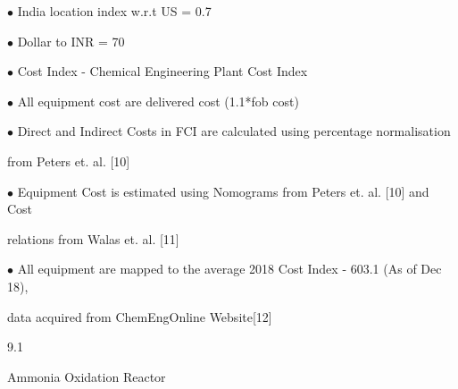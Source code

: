 \documentclass[a4paper,portrait,12pt]{article}
\begin{document}
\begin{flushleft}
$\bullet$ India location index w.r.t US = 0.7
\end{flushleft}


\begin{flushleft}
$\bullet$ Dollar to INR = 70
\end{flushleft}


\begin{flushleft}
$\bullet$ Cost Index - Chemical Engineering Plant Cost Index
\end{flushleft}


\begin{flushleft}
$\bullet$ All equipment cost are delivered cost (1.1*fob cost)
\end{flushleft}


\begin{flushleft}
$\bullet$ Direct and Indirect Costs in FCI are calculated using percentage normalisation
\end{flushleft}


\begin{flushleft}
from Peters et. al. [10]
\end{flushleft}


\begin{flushleft}
$\bullet$ Equipment Cost is estimated using Nomograms from Peters et. al. [10] and Cost
\end{flushleft}


\begin{flushleft}
relations from Walas et. al. [11]
\end{flushleft}


\begin{flushleft}
$\bullet$ All equipment are mapped to the average 2018 Cost Index - 603.1 (As of Dec 18),
\end{flushleft}


\begin{flushleft}
data acquired from ChemEngOnline Website[12]
\end{flushleft}





9.1





\begin{flushleft}
Ammonia Oxidation Reactor
\end{flushleft}
\end{document}
